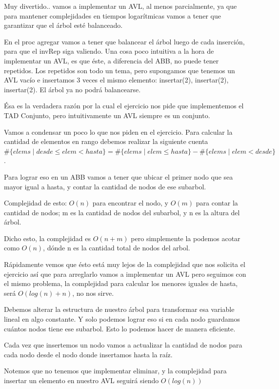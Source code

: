 \documentclass[10pt,a4paper]{article}
\begin{document}
\newpage
{}
\par Muy divertido.. vamos a implementar un AVL, al menos parcialmente, ya que para mantener complejidades
    en tiempos logarítmicas vamos a tener que garantizar que el árbol esté balanceado.
\par En el proc agregar vamos a tener que balancear el árbol luego de cada inserción, para que el invRep siga valiendo.
Una cosa poco intuitiva a la hora de implementar un AVL, es que éste, a diferencia del ABB, no puede tener repetidos.
Los repetidos son todo un tema, pero supongamos que tenemos un AVL vacío e insertamos 3 veces el mismo elemento:
insertar(2), insertar(2), insertar(2). El árbol ya no podrá balancearse.
\par Ésa es la verdadera razón por la cual el ejercicio nos pide que implementemos el TAD Conjunto, pero intuitivamente
un AVL siempre es un conjunto.
\par Vamos a condensar un poco lo que nos piden en el ejercicio. Para calcular la cantidad de elementos en rango debemos
realizar la siguiente cuenta \ensuremath{\text{\#}\{elems \mid desde \leq elem < hasta\} = \text{\#}\{elems \mid elem \leq hasta\} - \text{\#}\{elems \mid elem < desde\}}.
\par Para lograr eso en un ABB vamos a tener que ubicar el primer nodo que sea mayor igual a hasta, y contar la cantidad de nodos de ese subarbol.
\par Complejidad de esto: \ensuremath{O(n)} para encontrar el nodo, y \ensuremath{O(m)} para contar la cantidad de nodos; m es la cantidad de nodos del subarbol, y n es la altura del árbol.
\par Dicho esto, la complejidad es \ensuremath{O(n + m)} pero simplemente la podemos acotar como \ensuremath{O(n)}, dónde n es la cantidad total de nodos del arbol.
\par Rápidamente vemos que ésto está muy lejos de la complejidad que nos solicita el ejercicio así que para arreglarlo vamos a implementar un AVL
pero seguimos con el mismo problema, la complejidad para calcular los menores iguales de hasta, será \ensuremath{O(log(n) + n)}, no nos sirve.
\par Debemos alterar la estructura de nuestro árbol para transformar esa variable lineal en algo constante.
Y solo podemos lograr eso si en cada nodo guardamos cuántos nodos tiene ese subarbol. Esto lo podemos hacer de manera eficiente.
\par Cada vez que insertemos un nodo vamos a actualizar la cantidad de nodos para cada nodo desde el nodo donde insertamos hasta la raíz.
\par Notemos que no tenemos que implementar eliminar, y la complejidad para insertar un elemento en nuestro AVL seguirá siendo \ensuremath{O(log(n))} 
\end{document}
